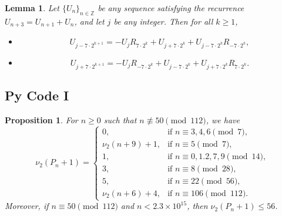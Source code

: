 \documentclass[10pt,a4paper]{amsart}
\newtheorem{lemma}{Lemma}
\newtheorem{proposition}{Proposition}
\begin{document}
\begin{lemma}\label{lem:shift}
	Let $\{U_n\}_{n\in\mathbb{Z}}$ be any sequence satisfying 
	the recurrence $U_{n+3} = U_{n+1} + U_n$, and let $j$ be 
	any integer. Then for all $k \ge 1$,
	\begin{itemize}
		\item[\rm(i)]
		\begin{equation*}
			U_{j-7\cdot 2^{k+1}} = -U_j R_{7\cdot 2^k} 
			+ U_{j+7\cdot 2^k} + U_{j-7\cdot 2^k}R_{-7\cdot 2^k},
		\end{equation*}
		\item[\rm(ii)]
		\begin{equation*}
			U_{j+7\cdot 2^{k+1}} = -U_j R_{-7\cdot 2^k} 
			+ U_{j-7\cdot 2^k} + U_{j+7\cdot 2^k}R_{7\cdot 2^k}.
		\end{equation*}
	\end{itemize}
\end{lemma}

 \subsection{Py Code I}\label{app1}

\begin{proposition}\label{prop:Pn}
	For $n\ge 0$ such that $n\not\equiv 50\pmod{112}$, we have
	\begin{equation*}
		\nu_{2}(P_{n}+1)= 
		\begin{cases}
			0, & \text{if } n\equiv 3,4,6\pmod{7},\\
		\nu_{2}(n+9)+1, & \text{if } n\equiv 5\pmod{7},\\
			1, & \text{if } n\equiv 0,1.2,7,9\pmod{14},\\
			3, & \text{if } n\equiv 8\pmod{28},\\
			5, & \text{if } n\equiv 22\pmod{56},\\
			\nu_{2}(n+6)+4, & \text{if } n\equiv 106\pmod{112}.
		\end{cases}
	\end{equation*}
	Moreover, if $n\equiv 50\pmod{112}$ and $n<2.3\times 10^{15}$, 
	then $\nu_{2}(P_{n}+1)\le 56$.
\end{proposition}
\end{document}
